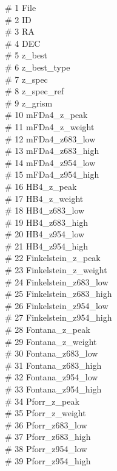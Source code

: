     \# 1 File \\
    \# 2 ID \\
    \# 3 RA \\
    \# 4 DEC \\
    \# 5 z\_best\\
    \# 6 z\_best\_type\\
    \# 7 z\_spec\\
    \# 8 z\_spec\_ref\\
    \# 9 z\_grism\\
    \# 10 mFDa4\_z\_peak \\
    \# 11 mFDa4\_z\_weight \\
    \# 12 mFDa4\_z683\_low \\
    \# 13 mFDa4\_z683\_high \\
    \# 14 mFDa4\_z954\_low \\
    \# 15 mFDa4\_z954\_high \\
    \# 16 HB4\_z\_peak \\
    \# 17 HB4\_z\_weight \\
    \# 18 HB4\_z683\_low \\
    \# 19 HB4\_z683\_high \\
    \# 20 HB4\_z954\_low \\
    \# 21 HB4\_z954\_high \\
    \# 22 Finkelstein\_z\_peak \\
    \# 23 Finkelstein\_z\_weight \\
    \# 24 Finkelstein\_z683\_low \\
    \# 25 Finkelstein\_z683\_high \\
    \# 26 Finkelstein\_z954\_low \\
    \# 27 Finkelstein\_z954\_high \\
    \# 28 Fontana\_z\_peak \\
    \# 29 Fontana\_z\_weight \\
    \# 30 Fontana\_z683\_low \\
    \# 31 Fontana\_z683\_high \\
    \# 32 Fontana\_z954\_low \\
    \# 33 Fontana\_z954\_high \\
    \# 34 Pforr\_z\_peak \\
    \# 35 Pforr\_z\_weight \\
    \# 36 Pforr\_z683\_low \\
    \# 37 Pforr\_z683\_high \\
    \# 38 Pforr\_z954\_low \\
    \# 39 Pforr\_z954\_high \\

